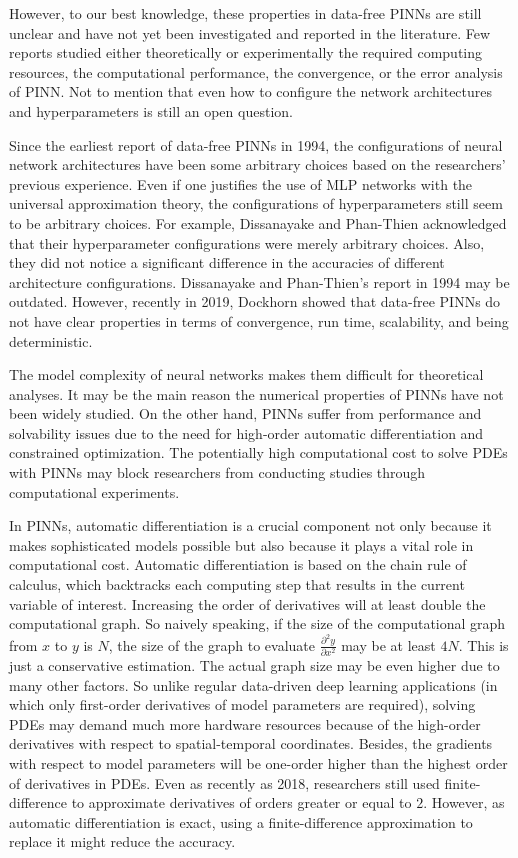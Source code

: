 However, to our best knowledge, these properties in data-free PINNs are still unclear and have not yet been investigated and reported in the literature.
Few reports studied either theoretically or experimentally the required computing resources, the computational performance, the convergence, or the error analysis of PINN.
Not to mention that even how to configure the network architectures and hyperparameters is still an open question. 

Since the earliest report of data-free PINNs in 1994, the configurations of neural network architectures have been some arbitrary choices based on the researchers' previous experience.
Even if one justifies the use of MLP networks with the universal approximation theory, the configurations of hyperparameters still seem to be arbitrary choices.
For example, Dissanayake and Phan-Thien acknowledged that their hyperparameter configurations were merely arbitrary choices.
Also, they did not notice a significant difference in the accuracies of different architecture configurations.
Dissanayake and Phan-Thien's report in 1994 may be outdated.
However, recently in 2019, Dockhorn \cite{dockhorn_discussion_2019} showed that data-free PINNs do not have clear properties in terms of convergence, run time, scalability, and being deterministic.

The model complexity of neural networks makes them difficult for theoretical analyses.
It may be the main reason the numerical properties of PINNs have not been widely studied.
On the other hand, PINNs suffer from performance and solvability issues due to the need for high-order automatic differentiation and constrained optimization.
The potentially high computational cost to solve PDEs with PINNs may block researchers from conducting studies through computational experiments.

In PINNs, automatic differentiation is a crucial component not only because it makes sophisticated models possible but also because it plays a vital role in computational cost.
Automatic differentiation is based on the chain rule of calculus, which backtracks each computing step that results in the current variable of interest.
Increasing the order of derivatives will at least double the computational graph.
So naively speaking, if the size of the computational graph from $x$ to $y$ is $N$, the size of the graph to evaluate $\frac{\partial^2 y}{\partial x^2}$ may be at least $4N$.
This is just a conservative estimation.
The actual graph size may be even higher due to many other factors.
So unlike regular data-driven deep learning applications (in which only first-order derivatives of model parameters are required), solving PDEs may demand much more hardware resources because of the high-order derivatives with respect to spatial-temporal coordinates.
Besides, the gradients with respect to model parameters will be one-order higher than the highest order of derivatives in PDEs. 
Even as recently as 2018, researchers \cite{sirignano_dgm:_2018} still used finite-difference to approximate derivatives of orders greater or equal to $2$.
However, as automatic differentiation is exact, using a finite-difference approximation to replace it might reduce the accuracy.

